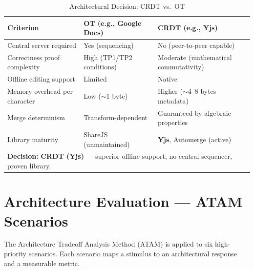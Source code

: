 \documentclass[12pt, a4paper, oneside]{article}
\begin{document}
\begin{table}[H]
\centering
\caption{Architectural Decision: CRDT vs.\ OT}
\begin{tabularx}{\textwidth}{l X X}
\toprule
\textbf{Criterion} & \textbf{OT (e.g., Google Docs)} & \textbf{CRDT (e.g., Yjs)} \\
\midrule
Central server required & Yes (sequencing) & No (peer-to-peer capable) \\
Correctness proof complexity & High (TP1/TP2 conditions) & Moderate (mathematical commutativity) \\
Offline editing support & Limited & Native \\
Memory overhead per character & Low ($\sim$1 byte) & Higher ($\sim$4--8 bytes metadata) \\
Merge determinism & Transform-dependent & Guaranteed by algebraic properties \\
Library maturity & ShareJS (unmaintained) & \textbf{Yjs}, Automerge (active) \\
\midrule
\multicolumn{3}{l}{\textbf{Decision:} \textcolor{crdt}{\textbf{CRDT (Yjs)}} --- superior offline support, no central sequencer, proven library.} \\
\bottomrule
\end{tabularx}
\end{table}

\section{Architecture Evaluation --- ATAM Scenarios}

The Architecture Tradeoff Analysis Method (ATAM) is applied to six high-priority scenarios. Each scenario maps a stimulus to an architectural response and a measurable metric.

\begin{table}[H]
\centering
\caption{ATAM Scenarios and Evaluations}
\end{table}
\end{document}
